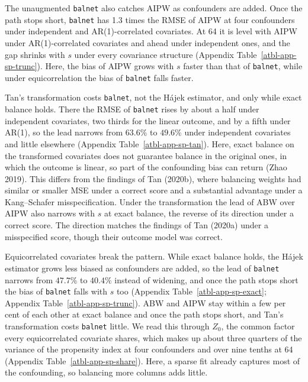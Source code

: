 \documentclass[
  12pt,
  a4paper,
]{article}
\begin{document}
The unaugmented \texttt{balnet} also catches AIPW as confounders are
added. Once the path stops short, \texttt{balnet} has 1.3 times the RMSE
of AIPW at four confounders under independent and AR(1)-correlated
covariates. At 64 it is level with AIPW under AR(1)-correlated
covariates and ahead under independent ones, and the gap shrinks with
\(s\) under every covariance structure
(Appendix Table~\ref{atbl-app-sp-trunc}). Here, the bias of AIPW grows
with \(s\) faster than that of \texttt{balnet}, while under
equicorrelation the bias of \texttt{balnet} falls faster.

Tan's transformation costs \texttt{balnet}, not the Hájek estimator, and
only while exact balance holds. There the RMSE of \texttt{balnet} rises
by about a half under independent covariates, two thirds for the linear
outcome, and by a fifth under AR(1), so the lead narrows from \(63.6\%\)
to \(49.6\%\) under independent covariates and little elsewhere
(Appendix Table~\ref{atbl-app-sp-tan}). Here, exact balance on the
transformed covariates does not guarantee balance in the original ones,
in which the outcome is linear, so part of the confounding bias can
return (Zhao 2019). This differs from the findings of Tan (2020b), where
balancing weights had similar or smaller MSE under a correct score and a
substantial advantage under a Kang--Schafer misspecification. Under the
transformation the lead of ABW over AIPW also narrows with \(s\) at
exact balance, the reverse of its direction under a correct score. The
direction matches the findings of Tan (2020a) under a misspecified
score, though their outcome model was correct.

Equicorrelated covariates break the pattern. While exact balance holds,
the Hájek estimator grows less biased as confounders are added, so the
lead of \texttt{balnet} narrows from \(47.7\%\) to \(40.4\%\) instead of
widening, and once the path stops short the bias of \texttt{balnet}
falls with \(s\) too (Appendix Table~\ref{atbl-app-sp-exact};
Appendix Table~\ref{atbl-app-sp-trunc}). ABW and AIPW stay within a few
per cent of each other at exact balance and once the path stops short,
and Tan's transformation costs \texttt{balnet} little. We read this
through \(Z_0\), the common factor every equicorrelated covariate
shares, which makes up about three quarters of the variance of the
propensity index at four confounders and over nine tenths at 64
(Appendix Table~\ref{atbl-app-sp-share}). Here, a sparse fit already
captures most of the confounding, so balancing more columns adds little.
\end{document}
